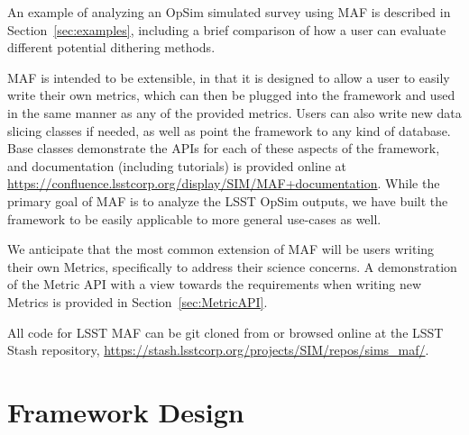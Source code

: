 \documentclass[]{spie}  %
\begin{document}
An example of analyzing an OpSim simulated survey using MAF is
described in Section~\ref{sec:examples}, including a brief comparison
of how a user can evaluate different potential dithering methods.

MAF is intended to be extensible, in that it is designed to allow a
user to easily write their own metrics, which can then be
plugged into the framework and used in the same manner as any of the
provided metrics. Users can also write new data slicing classes if
needed, as well as point the framework to any kind of database. Base
classes demonstrate the APIs for each of these aspects of the
framework, and documentation (including tutorials) is provided online
at
\url{https://confluence.lsstcorp.org/display/SIM/MAF+documentation}.  While the primary goal of
MAF is to analyze the LSST OpSim outputs, we have built the framework
to be easily applicable to more general use-cases as well. 

We anticipate that the most common extension of MAF will be users
writing their own Metrics, specifically to address their science
concerns. A demonstration of the Metric API with a view towards the
requirements when writing new Metrics is provided in Section~\ref{sec:MetricAPI}.

All code for LSST MAF can be git cloned from or browsed online at the LSST Stash 
repository, \url{https://stash.lsstcorp.org/projects/SIM/repos/sims_maf/}. 


\section{Framework Design}
\label{sec:fwdesign}
\end{document}
